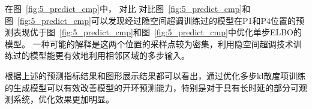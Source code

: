 在图~\ref{fig:5_predict_cmp}中，
对比
对比图~\ref{fig:5_predict_cmp}和图~\ref{fig:5_predict_cmp}可以发现经过隐空间超调训练过的模型在P1和P4位置的预测表现优于图~\ref{fig:5_predict_cmp}和图~\ref{fig:5_predict_cmp}中优化单步ELBO的模型。
一种可能的解释是这两个位置的采样点较为密集，利用隐空间超调技术训练过的模型能更有效地利用相邻区域的多步输入。

根据上述的预测指标结果和图形展示结果都可以看出，通过优化多步kl散度项训练的生成模型可以有效改善模型的开环预测能力，特别是对于具有长时延的部分可观测系统，优化效果更加明显。


